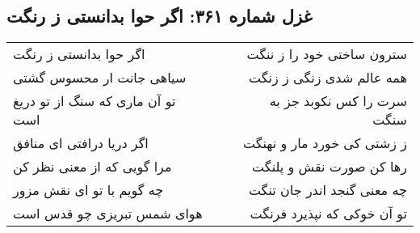 \begin{center}
\section*{غزل شماره ۳۶۱: اگر حوا بدانستی ز رنگت}
\label{sec:0361}
\begin{longtable}{l p{0.5cm} r}
اگر حوا بدانستی ز رنگت
&&
سترون ساختی خود را ز ننگت
\\
سیاهی جانت ار محسوس گشتی
&&
همه عالم شدی زنگی ز زنگت
\\
تو آن ماری که سنگ از تو دریغ است
&&
سرت را کس نکوبد جز به سنگت
\\
اگر دریا درافتی ای منافق
&&
ز زشتی کی خورد مار و نهنگت
\\
مرا گویی که از معنی نظر کن
&&
رها کن صورت نقش و پلنگت
\\
چه گویم با تو ای نقش مزور
&&
چه معنی گنجد اندر جان تنگت
\\
هوای شمس تبریزی چو قدس است
&&
تو آن خوکی که نپذیرد فرنگت
\\
\end{longtable}
\end{center}
